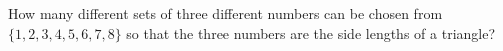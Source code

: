 How many different sets of three different numbers can be chosen from $\{1,2,3,4,5,6,7,8\}$ so that the three numbers are the side lengths of a triangle?
